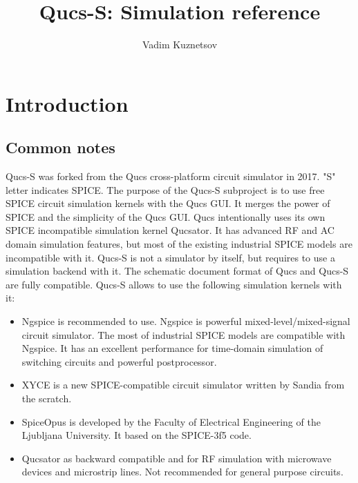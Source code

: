 \documentclass[a4paper,12pt]{article}
\title{Qucs-S: Simulation reference}
\author{Vadim Kuznetsov}
\begin{document}
\maketitle

\tableofcontents

\listoffigures

\listoftables



\section{Introduction} \label{sec:intro}

\subsection{Common notes}

Qucs-S was forked from the Qucs cross-platform circuit simulator in 2017. "S" letter indicates SPICE. The purpose of the Qucs-S subproject is to use free SPICE circuit simulation kernels with the Qucs GUI. It merges the power of SPICE and the simplicity of the Qucs GUI. Qucs intentionally uses its own SPICE incompatible simulation kernel Qucsator. It has advanced RF and AC domain simulation features, but most of the existing industrial SPICE models are incompatible with it. Qucs-S is not a simulator by itself, but requires to use a simulation backend with it. The schematic document format of Qucs and Qucs-S are fully compatible. Qucs-S allows to use the following simulation kernels with it:

\begin{itemize}
 \item  Ngspice is recommended to use. Ngspice is powerful mixed-level/mixed-signal circuit simulator. The most of industrial SPICE models are compatible with Ngspice. It has an excellent performance for time-domain simulation of switching circuits and powerful postprocessor.
 \item XYCE is a new SPICE-compatible circuit simulator written by Sandia from the scratch. 
 \item SpiceOpus is developed by the Faculty of Electrical Engineering of the Ljubljana University. It based on the SPICE-3f5 code.
 \item Qucsator as backward compatible and for RF simulation with microwave devices and microstrip lines. Not recommended for general purpose circuits. 
\end{itemize}
\end{document}
